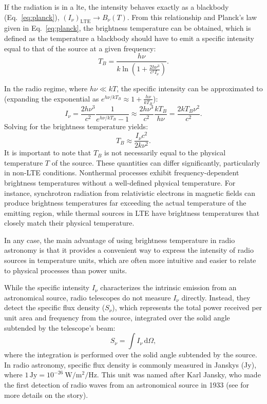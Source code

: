 If the radiation is in a \gls{lte}, the intensity behaves exactly as a blackbody (Eq.\ \ref{eq:planck}), $(I_\nu)_{\text{LTE}} \rightarrow B_\nu(T)$.
From this relationship and Planck's law given in Eq.\ \ref{eq:planck}, the brightness temperature can be obtained, which is defined as the temperature a blackbody should have to emit a specific intensity equal to that of the source at a given frequency:
\begin{equation}
	T_B = \frac{h\nu}{k \ln\left(1 + \frac{2h\nu^3}{c^2I_\nu}\right)}.
\end{equation}

In the radio regime, where $h\nu \ll kT$, the specific intensity can be approximated to (expanding the exponential as $e^{h\nu/kT_B} \approx 1 + \frac{h\nu}{kT_B}$):
\begin{equation}
	I_\nu = \frac{2h\nu^3}{c^2} \frac{1}{e^{h\nu/kT_B}-1} \approx \frac{2h\nu^3}{c^2} \frac{kT_B}{h\nu} = \frac{2kT_B\nu^2}{c^2}.
\end{equation}
Solving for the brightness temperature yields:
\begin{equation}
	T_B \approx \frac{I_\nu c^2}{2k\nu^2}.
\end{equation}
It is important to note that $T_B$ is not necessarily equal to the physical temperature $T$ of the source. These quantities can differ significantly, particularly in non-LTE conditions. Nonthermal processes exhibit frequency-dependent brightness temperatures without a well-defined physical temperature. For instance, synchrotron radiation from relativistic electrons in magnetic fields can produce brightness temperatures far exceeding the actual temperature of the emitting region, while thermal sources in LTE have brightness temperatures that closely match their physical temperature.

In any case, the main advantage of using brightness temperature in radio astronomy is that it provides a convenient way to express the intensity of radio sources in temperature units, which are often more intuitive and easier to relate to physical processes than power units.

While the specific intensity $I_\nu$ characterizes the intrinsic emission from an astronomical source, radio telescopes do not measure $I_\nu$ directly. Instead, they detect the specific flux density ($S_\nu$), which represents the total power received per unit area and frequency from the source, integrated over the solid angle subtended by the telescope's beam:
\begin{equation}
	S_\nu = \int I_\nu \, \mathrm{d}\Omega,
	\label{eq:flux_density}
\end{equation}
where the integration is performed over the solid angle subtended by the source. In radio astronomy, specific flux density is commonly measured in Janskys (Jy), where $1\,\mathrm{Jy} = 10^{-26} \ \si{\watt \per \meter \squared \per \hertz}$. This unit was named after Karl Jansky, who made the first detection of radio waves from an astronomical source in 1933 (see \citealt{Sullivan_1984} for more details on the story).

